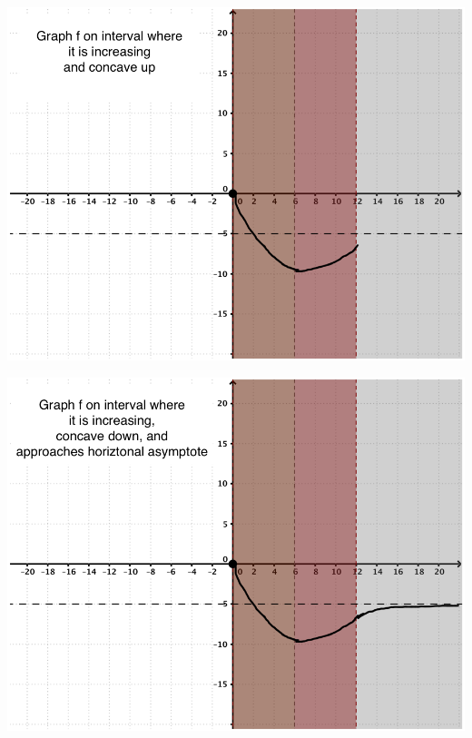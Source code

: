 \documentclass[nooutcomes]{ximera}
\begin{document}
\begin{problem}
\begin{freeResponse}
    \begin{image}
      \includegraphics[scale = 0.27]{Graphfunction5.png}
    \end{image}

    \begin{image}
      \includegraphics[scale = 0.27]{Graphfunction6.png}
    \end{image}


\end{freeResponse}
\end{problem}
\end{document}
